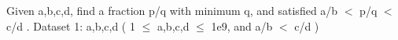 Given a,b,c,d, find a fraction p/q with minimum q, and satisfied a/b $<$ p/q $<$ c/d .
Dataset 1: a,b,c,d ( 1  $\le$  a,b,c,d  $\le$  1e9, and a/b $<$ c/d )